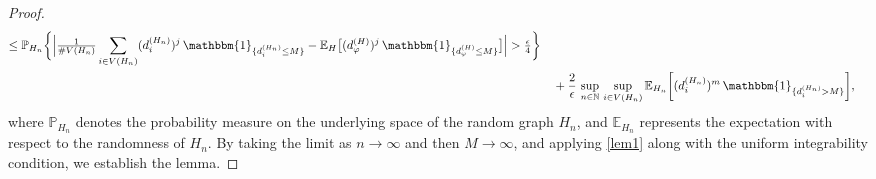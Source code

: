 \documentclass[11pt]{article}
\numberwithin{equation}{section}
\theoremstyle{plain}
\newcommand{\N}{\mathbb N}
\newcommand{\E}{\mathbb E}
\renewcommand{\P}{\mathbb P}
\begin{document}
\begin{proof}
\begin{align*}
\leq \P_{H_{n}}\bigg\{\Big |\tfrac{1}{\#V(H_{n})}\sum_{i\in V(H_{n})}(d_{i}^{(H_{n})})^{j}\,\mathbbm{1}_{\{d_{i}^{(H_{n})}\leq M\}}-\E_{H}\big[(d_{\varphi}^{(H)})^{j}\,\mathbbm{1}_{\{d_{\varphi}^{(H)}\leq M\}}\big]\Big|>\tfrac{\epsilon}{4}\bigg\}\\&\quad
+\frac{2}{\epsilon}\,\sup_{n\in\N}\,\sup_{i\in V(H_{n})}\E_{H_{n}}\bigg[(d_{i}^{(H_{n})})^{m}\,\mathbbm{1}_{\{d_{i}^{(H_{n})}> M\}}\bigg],
\end{align*}
where $\P_{H_{n}}$ denotes the probability measure on the underlying space of the random graph $H_{n}$, and $\E_{H_{n}}$ represents the expectation with respect to the randomness of $H_{n}$. By taking the limit as $n\to\infty$ and then $M\to\infty$, and applying \eqref{lem1} along with the uniform integrability condition, we establish the lemma.
\end{proof}
\end{document}

